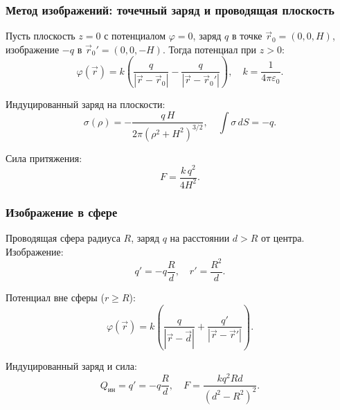 \documentclass[12pt, a4paper]{article}
\begin{document}
\subsubsection*{Метод изображений: точечный заряд и проводящая плоскость}

Пусть плоскость $z=0$ с потенциалом $\varphi=0$, заряд $q$ в точке $\vec r_0=(0,0,H)$, изображение $-q$ в $\vec r_0'=(0,0,-H)$. Тогда потенциал при $z>0$:
\[
\varphi(\vec r)=k\left(\frac{q}{|\vec r-\vec r_0|}-\frac{q}{|\vec r-\vec r_0'|}\right), \quad k=\frac{1}{4\pi\varepsilon_0}.
\]

Индуцированный заряд на плоскости:
\[
\sigma(\rho)=-\frac{q\,H}{2\pi(\rho^2+H^2)^{3/2}}, \quad \int \sigma\, dS = -q.
\]

Сила притяжения:
\[
F=\frac{k\,q^2}{4H^2}.
\]

\subsubsection*{Изображение в сфере}

Проводящая сфера радиуса $R$, заряд $q$ на расстоянии $d>R$ от центра. Изображение:
\[
q' = -q \frac{R}{d}, \quad r' = \frac{R^2}{d}.
\]

Потенциал вне сферы ($r \ge R$):
\[
\varphi(\vec r) = k\left(\frac{q}{|\vec r - \vec d|} + \frac{q'}{|\vec r - \vec r'|}\right).
\]

Индуцированный заряд и сила:
\[
Q_{\text{ин}} = q' = -q \frac{R}{d}, \quad F = \frac{k q^2 R d}{(d^2 - R^2)^2}.
\]
\end{document}
